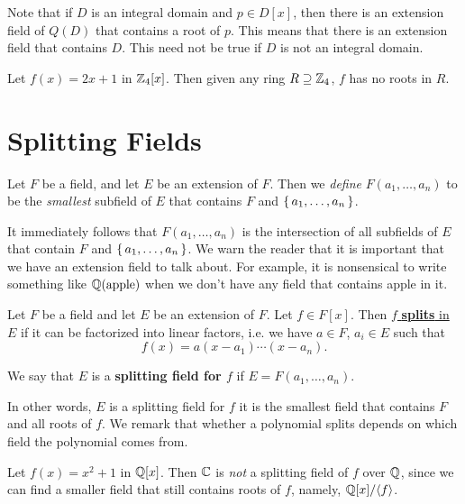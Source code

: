 \documentclass[oneside]{book}
\begin{document}
Note that if $D$ is an integral domain and $p \in D[x]$, then there is an
extension field of $Q(D)$ that contains a root of $p$. This means that there is
an extension field that contains $D$. This need not be true if $D$ is not an integral domain. 

\begin{example}
    Let $f(x) = 2x+1$ in $\mathbb{Z}_4[x]$. Then given any ring $R \supseteq \mathbb{Z}_4$,
    $f$ has no roots in $R$. 
\end{example}

\section{Splitting Fields}

\begin{definition}
    Let $F$ be a field, and let $E$ be an extension of $F$. Then we
    \emph{define} $F(a_1, \dots, a_n)$ to be the \emph{smallest} subfield of $E$
    that contains $F$ and $\set{a_1, \dots, a_n}$. 
\end{definition}
It immediately follows that $F(a_1, \dots, a_n)$ is the intersection of all
subfields of $E$ that contain $F$ and $\set{a_1, \dots, a_n}$. We warn the
reader that it is important that we have an extension field to talk about.  For
example, it is nonsensical to write something like $\mathbb{Q}(\text{apple})$ when we
don't have any field that contains apple in it.

\begin{definition}
    Let $F$ be a field and let $E$ be an extension of $F$. Let $f \in F[x]$.
    Then \underline{$f$ \textbf{splits} in $E$} if it can be factorized into linear
    factors, i.e. we have $a \in F$, $a_i \in E$ such that 
    \[
        f(x) = a(x - a_1) \cdots (x-a_n).
    \]

    We say that $E$ is a \textbf{splitting field for $f$} if $E = F(a_1, \dots, a_n)$.
\end{definition}
In other words, $E$ is a splitting field for $f$ it is the smallest field that
contains $F$ and all roots of $f$. We remark that whether a polynomial splits
depends on which field the polynomial comes from.

\begin{example}
    Let $f(x) = x^2 + 1$ in $\mathbb{Q}[x]$. Then $\mathbb{C}$ is \emph{not} a splitting field
    of $f$ over $\mathbb{Q}$, since we can find a smaller field that still contains
    roots of $f$, namely, $\mathbb{Q}[x]/{ \langle f \rangle }$.
\end{example}
\end{document}
